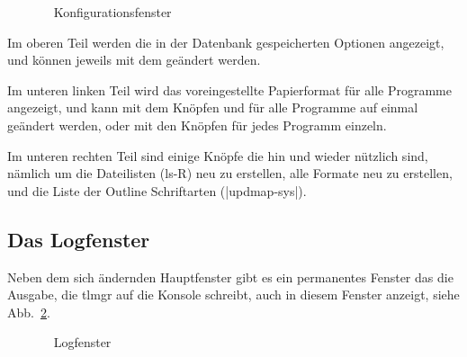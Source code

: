 \begin{figure}[ht!]
  \centering
  \caption{\tlmgr\  Konfigurationsfenster}
  \label{fig:gui:option}
\end{figure}

Im oberen Teil werden die in der Datenbank gespeicherten Optionen angezeigt,
und können jeweils mit dem  geändert werden.

Im unteren linken Teil wird das voreingestellte Papierformat für alle
Programme angezeigt, und kann mit dem Knöpfen  und
 für alle Programme auf einmal geändert werden, oder
mit den Knöpfen  für jedes Programm einzeln.

Im unteren rechten Teil sind einige Knöpfe die hin und wieder nützlich 
sind, nämlich um die Dateilisten (ls-R) neu zu erstellen, alle Formate
neu zu erstellen, und die Liste der Outline Schriftarten (|updmap-sys|).

\subsection{Das Logfenster}

Neben dem sich ändernden Hauptfenster gibt es ein permanentes Fenster
das die Ausgabe, die tlmgr auf die Konsole schreibt, auch in diesem
Fenster anzeigt, siehe Abb.~\ref{fig:gui:log}.

\begin{figure}[ht!]
  \centering
  \caption{\tlmgr\  Logfenster}
  \label{fig:gui:log}
\end{figure}

